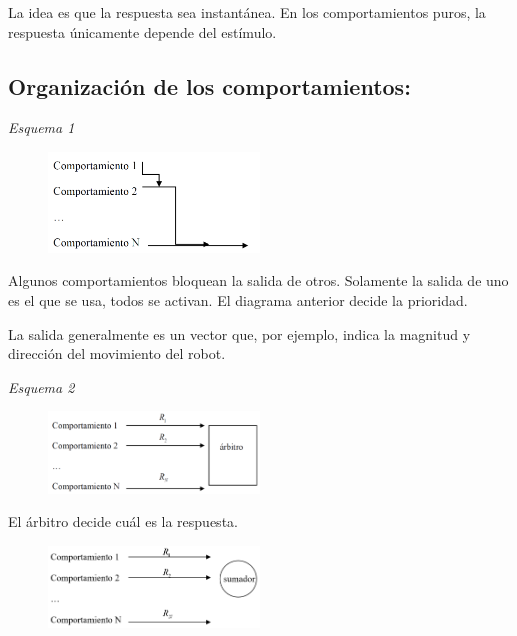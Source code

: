 La idea es que la respuesta sea instantánea.
En los comportamientos puros, la respuesta únicamente depende del estímulo.

\subsection{Organización de los comportamientos:} 

\textit{Esquema 1}

\begin{figure}[h!]
	\centering
	\includegraphics[width=0.5\textwidth]{images/img51.png}
	\label{figura51}
\end{figure}


Algunos comportamientos bloquean la salida de otros. Solamente la salida de uno es el que se usa, todos se activan. El diagrama anterior decide la prioridad.

La salida generalmente es un vector que, por ejemplo, indica la magnitud y dirección del movimiento del robot.

\textit{Esquema 2}

\begin{figure}[h!]
	\centering
	\includegraphics[width=0.5\textwidth]{images/img52.png}
	\label{figura52}
\end{figure}


El árbitro decide cuál es la respuesta.

\begin{figure}[h!]
	\centering
	\includegraphics[width=0.5\textwidth]{images/img53.png}
	\label{figura53}
\end{figure}


